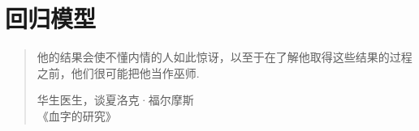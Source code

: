 \section{回归模型}\label{sec:12}
\begin{quote}
他的结果会使不懂内情的人如此惊讶，以至于在了解他取得这些结果的过程之前，他们很可能把他当作巫师.
\begin{flushright}华生医生，谈夏洛克·福尔摩斯\\《血字的研究》\end{flushright}
\end{quote}






